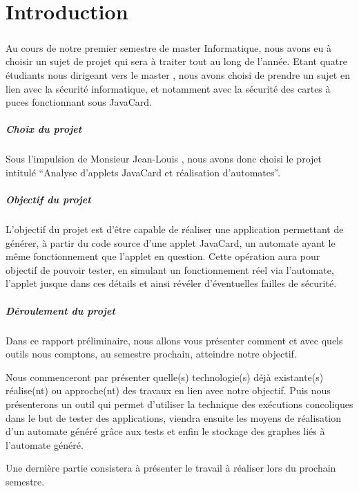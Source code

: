 \setcounter{page}{1}
\chapter*{Introduction}

\paragraph{}
Au cours de notre premier semestre de master Informatique, nous avons eu à choisir un sujet de projet qui sera à traiter tout au long de l'année.
Etant quatre étudiants nous dirigeant vers le master , nous avons choisi de prendre un sujet en lien avec la sécurité informatique, et notamment avec la sécurité des cartes à puces fonctionnant sous JavaCard.

\paragraph{Choix du projet}
Sous l'impulsion de Monsieur Jean-Louis , nous avons donc choisi le projet intitulé ``Analyse d'applets JavaCard et réalisation d'automates''.

\paragraph{Objectif du projet}
L'objectif du projet est d'être capable de réaliser une application permettant de générer, à partir du code source d'une applet JavaCard, un automate ayant le même fonctionnement que l'applet en question. Cette opération aura pour objectif de pouvoir tester, en simulant un fonctionnement réel via l'automate, l'applet jusque dans ces détails et ainsi révéler d'éventuelles failles de sécurité.

\paragraph{Déroulement du projet}
Dans ce rapport préliminaire, nous allons vous présenter comment et avec quels outils nous comptons, au semestre prochain, atteindre notre objectif.

Nous commenceront par présenter quelle(s) technologie(s) déjà existante(s) réalise(nt) ou approche(nt) des travaux en lien avec notre objectif. Puis nous présenterons un outil qui permet d'utiliser la technique des exécutions concoliques dans le but de tester des applications, viendra ensuite les moyens de réalisation d'un automate généré grâce aux tests et enfin le stockage des graphes liés à l'automate généré.

Une dernière partie consistera à présenter le travail à réaliser lors du prochain semestre.